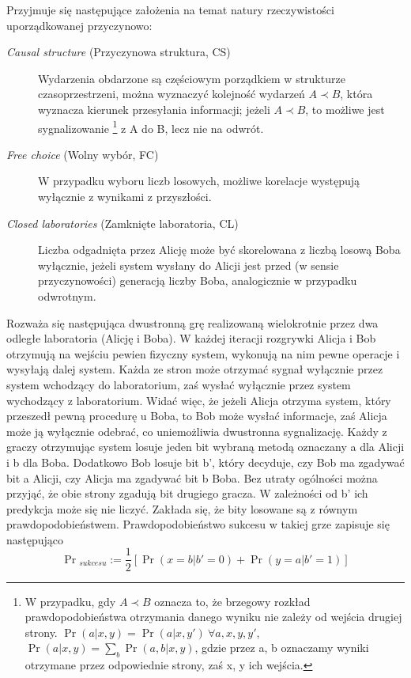 \documentclass[10pt]{article} %
\begin{document}
Przyjmuje się następujące założenia na temat natury rzeczywistości uporządkowanej przyczynowo:
\begin{description}
	\item[\textit{Causal structure} (Przyczynowa struktura, CS)]
	Wydarzenia obdarzone są częściowym porządkiem w strukturze czasoprzestrzeni, można wyznaczyć kolejność wydarzeń $A \prec B$, która wyznacza kierunek przesyłania informacji; jeżeli $A \prec B$, to możliwe jest sygnalizowanie
	\footnote
	{W przypadku, gdy $A \prec B$ oznacza to, że brzegowy rozkład prawdopodobieństwa otrzymania danego wyniku nie zależy od wejścia drugiej strony. $\Pr(a|x, y) = \Pr(a|x, y')~\forall a,x,y,y'$, $\Pr(a|x,y) = \sum_b \Pr(a,b|x,y)$, gdzie przez a, b oznaczamy wyniki otrzymane przez odpowiednie strony, zaś x, y ich wejścia.} 
	z A do B, lecz nie na odwrót.
	\item[\textit{Free choice} (Wolny wybór, FC)]  
	W przypadku wyboru liczb losowych, możliwe korelacje występują wyłącznie z wynikami z przyszłości.
	\item[\textit{Closed laboratories} (Zamknięte laboratoria, CL)] 
	Liczba odgadnięta przez Alicję może być skorelowana z liczbą losową Boba wyłącznie, jeżeli system wysłany do Alicji jest przed (w sensie przyczynowości) generacją liczby Boba, analogicznie w przypadku odwrotnym.	
\end{description}
Rozważa się następująca dwustronną grę realizowaną wielokrotnie przez dwa odległe laboratoria (Alicję i Boba). W każdej iteracji rozgrywki Alicja i Bob otrzymują na wejściu pewien fizyczny system, wykonują na nim pewne operacje i wysyłają dalej system. Każda ze stron może otrzymać sygnał wyłącznie przez 
system wchodzący do laboratorium, zaś wysłać wyłącznie przez system wychodzący z laboratorium. Widać więc, że jeżeli Alicja otrzyma system, który przeszedł pewną procedurę u Boba, to Bob może wysłać informacje, zaś Alicja może ją wyłącznie odebrać, co uniemożliwia dwustronna sygnalizację.
Każdy z graczy otrzymując system losuje jeden bit wybraną metodą oznaczany a dla Alicji i b dla Boba. Dodatkowo Bob losuje bit b', który decyduje, czy Bob ma zgadywać bit a Alicji, czy Alicja ma zgadywać bit b Boba. Bez utraty ogólności można przyjąć, że obie strony zgadują bit drugiego gracza. W zależności od b' ich 
predykcja może się nie liczyć. Zakłada się, że bity losowane są z równym prawdopodobieństwem. Prawdopodobieństwo sukcesu w takiej grze zapisuje się następująco
\begin{equation}
\Pr{}_{sukcesu} := \frac{1}{2} \left[ \Pr(x=b|b'=0) + \Pr(y=a|b' = 1)\right]
\end{equation}
\end{document}
